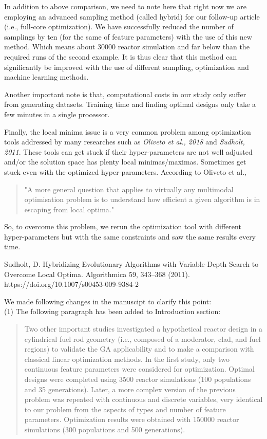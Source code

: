 \documentclass{ar2rc}
\begin{document}
    In addition to above comparison, we need to note here that right now we are employing an advanced sampling method (called hybrid) for our follow-up article (i.e., full-core optimization). We have successfully reduced the number of samplings by ten (for the same of feature parameters) with the use of this new method. Which means about 30000 reactor simulation and far below than the required runs of the second example. It is thus clear that this method can significantly be improved with the use of different sampling, optimization and machine learning methods.

    Another important note is that, computational costs in our study only suffer from generating datasets. Training time and finding optimal designs only take a few minutes in a single processor.

    Finally, the local minima issue is a very common problem among optimization tools addressed by many researches such as \textit{Oliveto et al., 2018} \cite{oliveto2017} and \textit{Sudholt, 2011}. These tools can get stuck if their hyper-parameters are not well adjusted and/or the solution space has plenty local minimas/maximas. Sometimes get stuck even with the optimized hyper-parameters. According to Oliveto et al.,

    \begin{quotation}
        "A more general question that applies to virtually any multimodal optimisation problem is to understand how efficient a given algorithm is in escaping from local optima."
    \end{quotation}

    So, to overcome this problem, we rerun the optimization tool with different hyper-parameters but with the same constraints and saw the same results every time.

    Sudholt, D. Hybridizing Evolutionary Algorithms with Variable-Depth Search to Overcome Local Optima. Algorithmica 59, 343–368 (2011). https://doi.org/10.1007/s00453-009-9384-2

    We made following changes in the manuscipt to clarify this point:\\

     (1) The following paragraph has been added to Introduction section:\\

    \begin{quote}
        Two other important studies \cite{pereira1999, pereira2003} investigated a hypothetical reactor design in a cylindrical fuel rod geometry (i.e., composed of a moderator, clad, and fuel regions) to validate the GA applicability and to make a comparison with classical linear optimization methods. In the first study, only two continuous feature parameters were considered for optimization. Optimal designs were completed using 3500 reactor simulations (100 populations and 35 generations). Later, a more complex version of the previous problem was repeated with continuous and discrete variables, very identical to our problem from the aspects of types and number of feature parameters. Optimization results were obtained with 150000 reactor simulations (300 populations and 500 generations).
    \end{quote}
\end{document}
